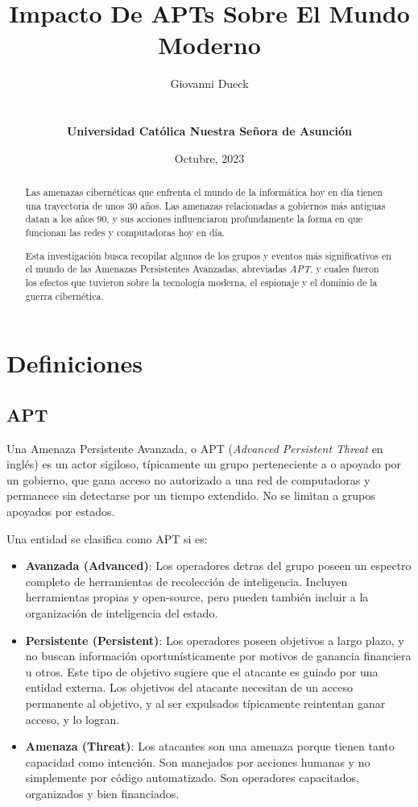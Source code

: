 \documentclass{article}
\title{Impacto De APTs Sobre El Mundo Moderno}
\author{Giovanni Dueck\\\UrlFont{giodueck@gmail.com}\\\\{\bf Universidad Católica Nuestra Señora de Asunción}}
\date{Octubre, 2023}
\begin{document}

\maketitle

\begin{abstract}

Las amenazas cibernéticas que enfrenta el mundo de la informática hoy en día tienen una trayectoria de unos 30 años. Las amenazas relacionadas a gobiernos más antiguas datan a los años 90, y sus acciones influenciaron profundamente la forma en que funcionan las redes y computadoras hoy en día.

Esta investigación busca recopilar algunos de los grupos y eventos más significativos en el mundo de las Amenazas Persistentes Avanzadas, abreviadas {\it APT}, y cuales fueron los efectos que tuvieron sobre la tecnología moderna, el espionaje y el dominio de la guerra cibernética.

\end{abstract}

\section{Definiciones}
\subsection{APT}
Una Amenaza Persistente Avanzada, o APT ({\it Advanced Persistent Threat} en inglés) es un actor sigiloso, típicamente un grupo perteneciente a o apoyado por un gobierno, que gana acceso no autorizado a una red de computadoras y permanece sin detectarse por un tiempo extendido. No se limitan a grupos apoyados por estados. \autocite{cybereason-apt} 

Una entidad se clasifica como APT si es:
\begin{itemize}
    \item {\bf Avanzada (Advanced)}: Los operadores detras del grupo poseen un espectro completo de herramientas de recolección de inteligencia. Incluyen herramientas propias y open-source, pero pueden también incluir a la organización de inteligencia del estado.
    \item {\bf Persistente (Persistent)}: Los operadores poseen objetivos a largo plazo, y no buscan información oportunísticamente por motivos de ganancia financiera u otros. Este tipo de objetivo sugiere que el atacante es guiado por una entidad externa. Los objetivos del atacante necesitan de un acceso permanente al objetivo, y al ser expulsados típicamente reintentan ganar acceso, y lo logran.
    \item {\bf Amenaza (Threat)}: Los atacantes son una amenaza porque tienen tanto capacidad como intención. Son manejados por acciones humanas y no simplemente por código automatizado. Son operadores capacitados, organizados y bien financiados. \autocite{itgov-apt}
\end{itemize}
\end{document}
